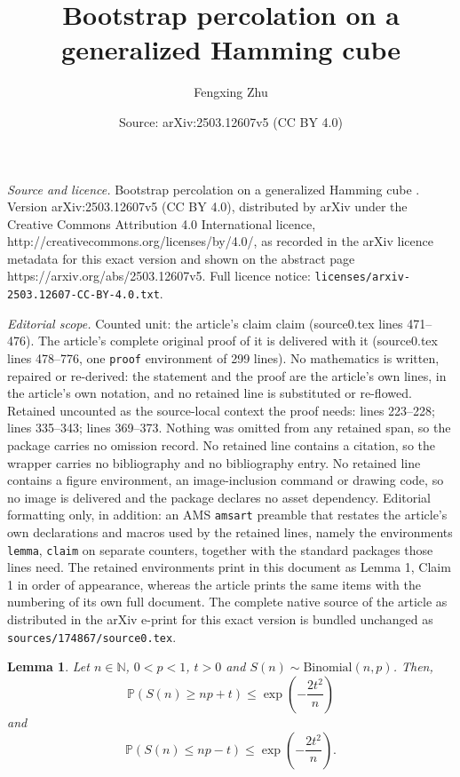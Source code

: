 \documentclass[10pt,a4paper]{amsart}
\title{Bootstrap percolation on a generalized Hamming cube \MakeUppercase{\romannumeral 2}}
\author{Fengxing Zhu}
\date{Source: arXiv:2503.12607v5 (CC BY 4.0)}
\newtheorem{lemma}{Lemma}
\renewcommand{\geq}{\geqslant}
\renewcommand{\leq}{\leqslant}
\begin{document}
\maketitle

\noindent\emph{Source and licence.} Bootstrap percolation on a generalized Hamming cube \MakeUppercase{}. Version arXiv:2503.12607v5 (CC BY 4.0), distributed by arXiv under the Creative Commons Attribution 4.0 International licence, http://creativecommons.org/licenses/by/4.0/, as recorded in the arXiv licence metadata for this exact version and shown on the abstract page https://arxiv.org/abs/2503.12607v5. Full licence notice: \texttt{licenses/arxiv-2503.12607-CC-BY-4.0.txt}.\par\smallskip

\noindent\textit{Editorial scope.} Counted unit: the article's claim claim (source0.tex lines 471--476). The article's complete original proof of it is delivered with it (source0.tex lines 478--776, one \texttt{proof} environment of 299 lines). No mathematics is written, repaired or re-derived: the statement and the proof are the article's own lines, in the article's own notation, and no retained line is substituted or re-flowed.  Retained uncounted as the source-local context the proof needs: lines 223--228; lines 335--343; lines 369--373.  Nothing was omitted from any retained span, so the package carries no omission record.  No retained line contains a citation, so the wrapper carries no bibliography and no bibliography entry.  No retained line contains a figure environment, an image-inclusion command or drawing code, so no image is delivered and the package declares no asset dependency.  Editorial formatting only, in addition: an AMS \texttt{amsart} preamble that restates the article's own declarations and macros used by the retained lines, namely the environments \texttt{lemma}, \texttt{claim} on separate counters, together with the standard packages those lines need.  The retained environments print in this document as Lemma 1, Claim 1 in order of appearance, whereas the article prints the same items with the numbering of its own full document.  The complete native source of the article as distributed in the arXiv e-print for this exact version is bundled unchanged as \texttt{sources/174867/source0.tex}.
\begin{lemma} \label{lemmaA1}
Let $n \in \mathbb{N}$, $0<p<1$, $t>0$ and $S(n) \sim \text{Binomial}(n,p)$. Then,
$$\mathbb{P}(S(n) \geq np+t) \leq \exp\left(-\frac{2t^2}{n}\right)$$
and
$$\mathbb{P}(S(n) \leq np-t) \leq \exp\left(-\frac{2t^2}{n}\right).$$
\end{lemma}
\end{document}
